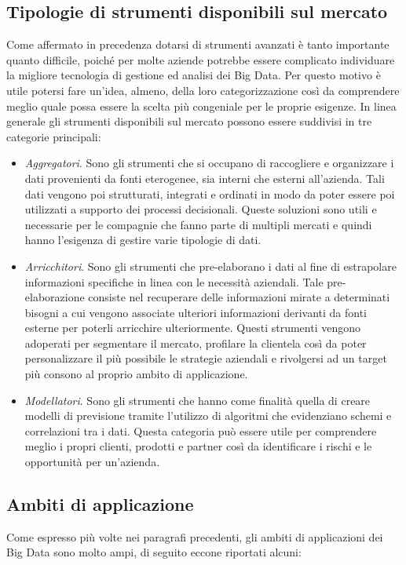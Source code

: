 \subsection{Tipologie di strumenti disponibili sul mercato}
Come affermato in precedenza dotarsi di strumenti avanzati è tanto importante quanto difficile, poiché per molte aziende potrebbe essere complicato individuare la migliore tecnologia di gestione ed analisi dei Big Data. Per questo motivo è utile potersi fare un’idea, almeno, della loro categorizzazione così da comprendere meglio quale possa essere la scelta più congeniale per le proprie esigenze. In linea generale gli strumenti disponibili sul mercato possono essere suddivisi in tre categorie principali:\cite{sadas_big_data}

\begin{itemize}
    \item \textit{Aggregatori}. Sono gli strumenti che si occupano di raccogliere e organizzare i dati provenienti da fonti eterogenee, sia interni che esterni all’azienda. Tali dati vengono poi strutturati, integrati e ordinati in modo da poter essere poi utilizzati a supporto dei processi decisionali. Queste soluzioni sono utili e necessarie per le compagnie che fanno parte di multipli mercati e quindi hanno l’esigenza di gestire varie tipologie di dati.
    \item \textit{Arricchitori}. Sono gli strumenti che pre-elaborano i dati al fine di estrapolare informazioni specifiche in linea con le necessità aziendali. Tale pre-elaborazione consiste nel recuperare delle informazioni mirate a determinati bisogni a cui vengono associate ulteriori informazioni derivanti da fonti esterne per poterli arricchire ulteriormente. Questi strumenti vengono adoperati per segmentare il mercato, profilare la clientela così da poter personalizzare il più possibile le strategie aziendali e rivolgersi ad un target più consono al proprio ambito di applicazione.
    \item \textit{Modellatori}. Sono gli strumenti che hanno come finalità quella di creare modelli di previsione tramite l’utilizzo di algoritmi che evidenziano schemi e correlazioni tra i dati. Questa categoria può essere utile per comprendere meglio i propri clienti, prodotti e partner così da identificare i rischi e le opportunità per un’azienda.
\end{itemize}

\subsection{Ambiti di applicazione}
Come espresso più volte nei paragrafi precedenti, gli ambiti di applicazioni dei Big Data sono molto ampi, di seguito eccone riportati alcuni:\cite{sciencedirect_big_data_technologies}

